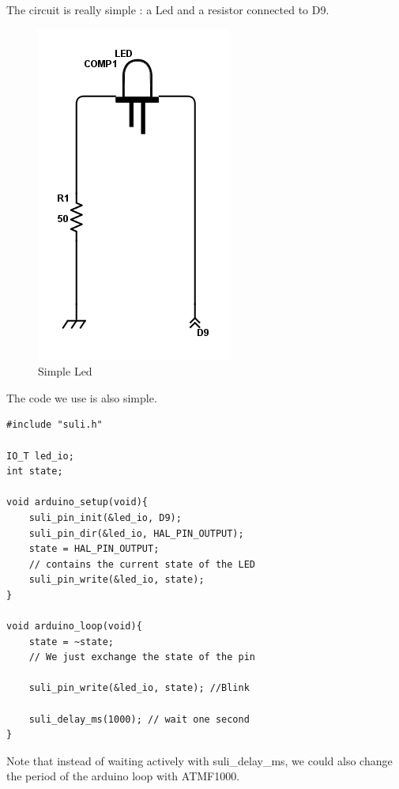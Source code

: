 The circuit is really simple : a Led and a resistor connected to D9.

\begin{figure}[ht]
\centering
\includegraphics[width=.6\linewidth]{led_scheme}
\caption[Simple Led]{\label{f:led_scheme}Simple Led}
\end{figure}

The code we use is also simple.

\begin{lstlisting}[frame=single]
#include "suli.h"

IO_T led_io;
int state;

void arduino_setup(void){
    suli_pin_init(&led_io, D9);
    suli_pin_dir(&led_io, HAL_PIN_OUTPUT);
    state = HAL_PIN_OUTPUT; 
    // contains the current state of the LED
    suli_pin_write(&led_io, state);
}

void arduino_loop(void){
    state = ~state; 
    // We just exchange the state of the pin

    suli_pin_write(&led_io, state); //Blink

    suli_delay_ms(1000); // wait one second
}
\end{lstlisting}

Note that instead of waiting actively with suli\_delay\_ms, we could also change the period of the arduino loop with ATMF1000.

